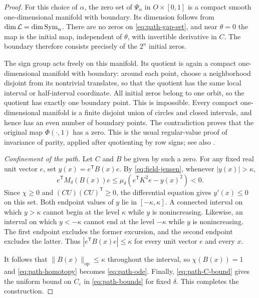\begin{proof}
For this choice of $\alpha$, the zero set of $\Psi_\alpha$ in
$O\times[0,1]$ is a compact smooth one-dimensional manifold with
boundary.  Its dimension follows from
$\dim\mathcal L=\dim\operatorname{Sym}_n$.  There are no zeros on
\eqref{eq:path-gap-set}, and near $\theta=0$ the map is the initial
map, independent of $\theta$, with invertible derivative in $C$.
The boundary therefore consists precisely of the $2^n$ initial zeros.

The sign group acts freely on this manifold.  Its quotient is again
a compact one-dimensional manifold with boundary: around each point,
choose a neighborhood disjoint from its nontrivial translates, so
that the quotient has the same local interval or half-interval
coordinate.  All initial zeros belong to one orbit, so the quotient
has exactly one boundary point.  This is impossible.  Every compact
one-dimensional manifold is a finite disjoint union of circles and
closed intervals, and hence has an even number of boundary points.
The contradiction proves that the original map $\Phi(\cdot,1)$ has
a zero.  This is the usual regular-value proof of invariance of parity,
applied after quotienting by row signs; see also
\cite[Sections~2--4]{Milnor1965}.

\smallskip
\noindent\emph{Confinement of the path.}
Let $C$ and $B$ be given by such a zero.  For any fixed real unit
vector $e$, set $y(x)=e^{\mathsf T}B(x)e$.  By
\eqref{eq:field-jensen}, whenever $|y(x)|>\kappa$,
\[
    e^{\mathsf T}M_\delta(B(x))e
       \leq\mu_\delta\!\left(e^{\mathsf T}K^2e-y(x)^2\right)<0.
\]
Since $\chi\geq0$ and $(CU)(CU)^{\mathsf T}\geq0$, the differential
equation gives $y'(x)\leq0$ on this set.  Both endpoint values of $y$
lie in $[-\kappa,\kappa]$.  A connected interval on which $y>\kappa$
cannot begin at the level $\kappa$ while $y$ is nonincreasing.
Likewise, an interval on which $y<-\kappa$ cannot end at the level
$-\kappa$ while $y$ is nonincreasing.  The first endpoint excludes
the former excursion, and the second endpoint excludes the latter.
Thus $|e^{\mathsf T}B(x)e|\leq\kappa$ for every unit vector $e$ and
every $x$.

It follows that $\|B(x)\|_{\mathrm{op}}\leq\kappa$ throughout the
interval, so $\chi(B(x))=1$ and \eqref{eq:path-homotopy} becomes
\eqref{eq:path-ode}.  Finally, \eqref{eq:path-C-bound} gives the
uniform bound on $C_\varepsilon$ in \eqref{eq:path-bounds} for fixed
$\delta$.  This completes the construction.
\end{proof}
